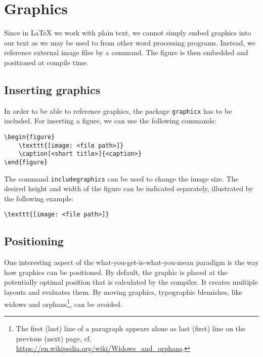 \chapter{Graphics}
\label{sec:graphics}

Since in \LaTeX{} we work with plain text, we cannot simply embed graphics into our text as we may be used to from other  word processing programs. 
Instead, we reference external image files by a command. The figure is then embedded and positioned at compile time.

\section{Inserting graphics}
\label{sec:display-graphics}
In order to be able to reference graphics, the package \texttt{graphicx} has to be included. For inserting a figure, we can use the following commands:
	
\begin{verbatim}
\begin{figure}
	\texttt{[image: <file path>]}
	\caption[<short title>]{<caption>}
\end{figure}
\end{verbatim}

\noindent The command \texttt{includegraphics} can be used to change the image size. The desired height and width of the figure can be indicated separately,  illustrated by the following example:

\begin{verbatim}
\texttt{[image: <file path>]}
\end{verbatim}

\section{Positioning}
\label{sec:graphics-placement}
One interesting aspect of the  what-you-get-is-what-you-mean paradigm is the way how graphics can be positioned. 
By default, the graphic is placed at the potentially optimal position that is calculated by the compiler. It creates multiple layouts and evaluates them. By moving graphics, typographic blemishes, like widows and orphans\footnote{The first (last) line of a paragraph appears alone as last (first) line on the previous (next) page, cf. \url{https://en.wikipedia.org/wiki/Widows_and_orphans}.}, can be avoided. 

